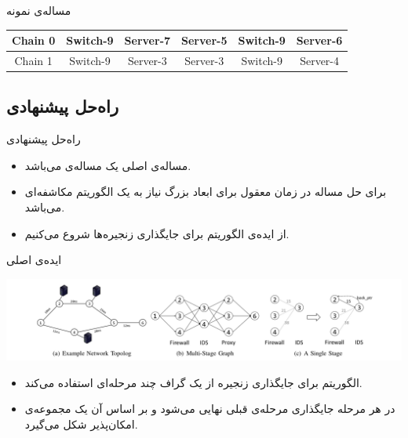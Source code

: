 \documentclass{beamer}
\makeatletter
\newcommand{\RTList}{\raggedleft\rightskip\@totalleftmargin}
\makeatother
\begin{document}
\begin{persian}
\begin{frame}{مساله‌ی نمونه}
\begin{table}[h!]
\begin{center}
\begin{latin}
\begin{tabular}{|c|c|c|c|c|c|}
            \hline
            Chain 0 & Switch-9 & Server-7 & Server-5 & Switch-9 & Server-6 \\
            \hline
            Chain 1 & Switch-9 & Server-3 & Server-3 & Switch-9 & Server-4 \\
            \hline
        \end{tabular}\end{latin}\end{center}
    \end{table}
\end{frame}
\begin{frame}{}
    \section{راه‌حل پیشنهادی}
\end{frame}
\begin{frame}{راه‌حل پیشنهادی}
    \begin{itemize}\RTList{}
        \item مساله‌ی اصلی یک مساله‌ی  می‌باشد.
        \item برای حل مساله در زمان معقول برای ابعاد بزرگ نیاز به یک الگوریتم مکاشفه‌ای می‌باشد.
        \item از ایده‌ی الگوریتم  برای جایگذاری زنجیره‌ها شروع می‌کنیم.
    \end{itemize}
\end{frame}
\begin{frame}{ایده‌ی اصلی}
    \begin{center}
        \includegraphics[scale=0.3]{images/bari.png}
    \end{center}
    \begin{itemize}\RTList{}
        \item الگوریتم برای جایگذاری زنجیره از یک گراف چند مرحله‌ای استفاده می‌کند.
        \item در هر مرحله جایگذاری مرحله‌ی قبلی نهایی می‌شود و بر اساس آن یک مجموعه‌ی امکان‌پذیر شکل می‌گیرد.

\end{itemize}
\end{frame}
\end{persian}
\end{document}
